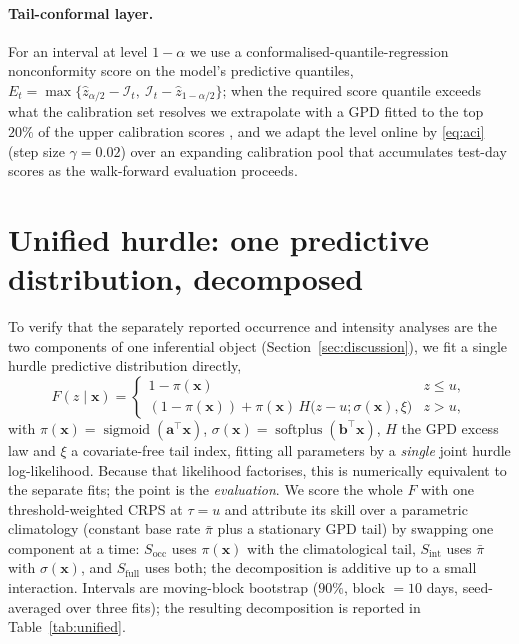 \documentclass[11pt,a4paper]{article}
\newcommand{\Ind}{\mathcal{I}}                 %
\newcommand{\sigmoid}{\operatorname{sigmoid}}
\newcommand{\softplus}{\operatorname{softplus}}
\newcommand{\bx}{\bm{x}}
\begin{document}
\paragraph{Tail-conformal layer.} For an interval at level $1-\alpha$ we use a
conformalised-quantile-regression nonconformity score on the model's predictive
quantiles, $E_t=\max\{\widehat z_{\alpha/2}-\Ind_t,\ \Ind_t-\widehat z_{1-\alpha/2}\}$;
when the required score quantile exceeds what the calibration set resolves we
extrapolate with a GPD fitted to the top $20\%$ of the upper calibration scores
\citep{pasche2025extreme}, and we adapt the level online by \eqref{eq:aci}
(step size $\gamma=0.02$) over an expanding calibration pool that accumulates
test-day scores as the walk-forward evaluation proceeds.

\section{Unified hurdle: one predictive distribution, decomposed}\label{app:unified}

To verify that the separately reported occurrence and intensity analyses are the
two components of one inferential object (Section~\ref{sec:discussion}), we fit a
single hurdle predictive distribution directly,
\[
F(z\mid\bx)=\begin{cases}1-\pi(\bx) & z\le u,\\[2pt]
(1-\pi(\bx))+\pi(\bx)\,H\!\big(z-u;\sigma(\bx),\xi\big) & z>u,\end{cases}
\]
with $\pi(\bx)=\sigmoid(\bm a^\top\bx)$, $\sigma(\bx)=\softplus(\bm b^\top\bx)$,
$H$ the GPD excess law and $\xi$ a covariate-free tail index, fitting all
parameters by a \emph{single} joint hurdle log-likelihood. Because that likelihood
factorises, this is numerically equivalent to the separate fits; the point is the
\emph{evaluation}. We score the whole $F$ with one threshold-weighted CRPS at
$\tau=u$ and attribute its skill over a parametric climatology (constant base rate
$\bar\pi$ plus a stationary GPD tail) by swapping one component at a time:
$S_{\mathrm{occ}}$ uses $\pi(\bx)$ with the climatological tail, $S_{\mathrm{int}}$
uses $\bar\pi$ with $\sigma(\bx)$, and $S_{\mathrm{full}}$ uses both; the
decomposition is additive up to a small interaction. Intervals are moving-block
bootstrap ($90\%$, block $=10$ days, seed-averaged over three fits); the resulting decomposition is reported in
Table~\ref{tab:unified}.





\end{document}
